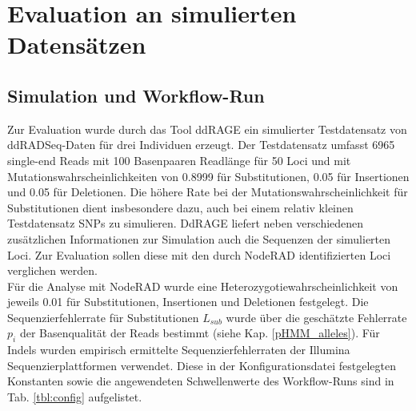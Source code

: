 \chapter{Evaluation an simulierten Datensätzen} \label{sec:eval}

\section{Simulation und Workflow-Run} \label{sec:sim}

Zur Evaluation wurde durch das Tool ddRAGE \cite{timm_2018, ddrage} ein simulierter Testdatensatz \cite{testdata} von ddRADSeq-Daten für drei Individuen erzeugt. Der Testdatensatz umfasst 6965 single-end Reads mit 100 Basenpaaren Readlänge für 50 Loci und mit Mutationswahrscheinlichkeiten von 0.8999 für Substitutionen, 0.05 für Insertionen und 0.05 für Deletionen. Die höhere Rate bei der Mutationswahrscheinlichkeit für Substitutionen dient insbesondere dazu, auch bei einem relativ kleinen Testdatensatz SNPs zu simulieren. DdRAGE liefert neben verschiedenen zusätzlichen Informationen zur Simulation auch die Sequenzen der simulierten Loci. Zur Evaluation sollen diese mit den durch NodeRAD \cite{noderad} identifizierten Loci verglichen werden.\\

Für die Analyse mit NodeRAD wurde eine Heterozygotiewahrscheinlichkeit von jeweils 0.01 für Substitutionen, Insertionen und Deletionen festgelegt. Die Sequenzierfehlerrate für Substitutionen $L_{sub}$ wurde über die geschätzte Fehlerrate $p_{i}$ der Basenqualität der Reads bestimmt (siehe Kap. \ref{pHMM_alleles}). Für Indels wurden empirisch ermittelte Sequenzierfehlerraten der Illumina Sequenzierplattformen \cite{schirmer_2016} verwendet. Diese in der Konfigurationsdatei festgelegten Konstanten sowie die angewendeten Schwellenwerte des Workflow-Runs sind in Tab. \ref{tbl:config} aufgelistet. \\


